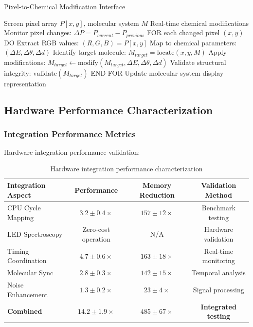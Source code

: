 \documentclass[12pt,a4paper]{article}
\begin{document}
\begin{algorithm}[H]
\caption{Pixel-to-Chemical Modification Interface}
\begin{algorithmic}[1]
\REQUIRE Screen pixel array $P[x,y]$, molecular system $M$
\ENSURE Real-time chemical modifications
\STATE Monitor pixel changes: $\Delta P = P_{current} - P_{previous}$
\STATE FOR each changed pixel $(x,y)$ DO
\STATE \quad Extract RGB values: $(R, G, B) = P[x,y]$
\STATE \quad Map to chemical parameters: $(\Delta E, \Delta \theta, \Delta d)$
\STATE \quad Identify target molecule: $M_{target} = \text{locate}(x, y, M)$
\STATE \quad Apply modifications: $M_{target} \leftarrow \text{modify}(M_{target}, \Delta E, \Delta \theta, \Delta d)$
\STATE \quad Validate structural integrity: $\text{validate}(M_{target})$
\STATE END FOR
\STATE Update molecular system display representation
\end{algorithmic}
\end{algorithm}

\subsection{Hardware Performance Characterization}

\subsubsection{Integration Performance Metrics}

Hardware integration performance validation:

\begin{table}[H]
\centering
\begin{tabular}{|l|c|c|c|}
\hline
\textbf{Integration Aspect} & \textbf{Performance} & \textbf{Memory Reduction} & \textbf{Validation Method} \\
\hline
CPU Cycle Mapping & $3.2 \pm 0.4 \times$ & $157 \pm 12 \times$ & Benchmark testing \\
LED Spectroscopy & Zero-cost operation & N/A & Hardware validation \\
Timing Coordination & $4.7 \pm 0.6 \times$ & $163 \pm 18 \times$ & Real-time monitoring \\
Molecular Sync & $2.8 \pm 0.3 \times$ & $142 \pm 15 \times$ & Temporal analysis \\
Noise Enhancement & $1.3 \pm 0.2 \times$ & $23 \pm 4 \times$ & Signal processing \\
\hline
\textbf{Combined} & \textbf{$14.2 \pm 1.9 \times$} & \textbf{$485 \pm 67 \times$} & \textbf{Integrated testing} \\
\hline
\end{tabular}
\caption{Hardware integration performance characterization}
\end{table}
\end{document}
